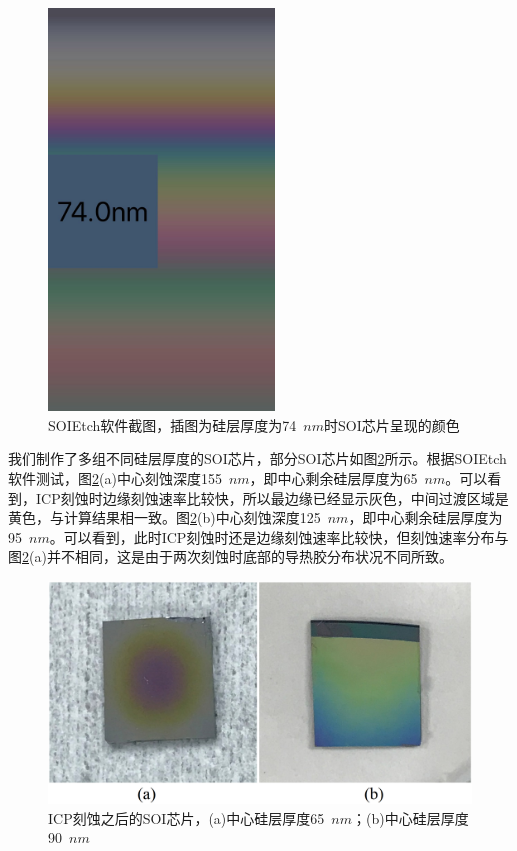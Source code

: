 \begin{figure}[htb]
	\centering
	\includegraphics[width=6cm]{./Pictures/color_app.jpeg}
	\captionsetup{justification=centering}
	\caption{SOIEtch软件截图，插图为硅层厚度为74~$nm$时SOI芯片呈现的颜色}
	\label{color_app}
\end{figure}

我们制作了多组不同硅层厚度的SOI芯片，部分SOI芯片如图\ref{color_experiment}所示。根据SOIEtch软件测试，图\ref{color_experiment}(a)中心刻蚀深度155~$nm$，即中心剩余硅层厚度为65~$nm$。可以看到，ICP刻蚀时边缘刻蚀速率比较快，所以最边缘已经显示灰色，中间过渡区域是黄色，与计算结果相一致。图\ref{color_experiment}(b)中心刻蚀深度125~$nm$，即中心剩余硅层厚度为95~$nm$。可以看到，此时ICP刻蚀时还是边缘刻蚀速率比较快，但刻蚀速率分布与图\ref{color_experiment}(a)并不相同，这是由于两次刻蚀时底部的导热胶分布状况不同所致。

\begin{figure}[htb]
	\centering
	\includegraphics[width=12cm]{./Pictures/color_experiment.jpg}
	\captionsetup{justification=centering}
	\caption{ICP刻蚀之后的SOI芯片，(a)中心硅层厚度65~$nm$；(b)中心硅层厚度90~$nm$}
	\label{color_experiment}
\end{figure}

